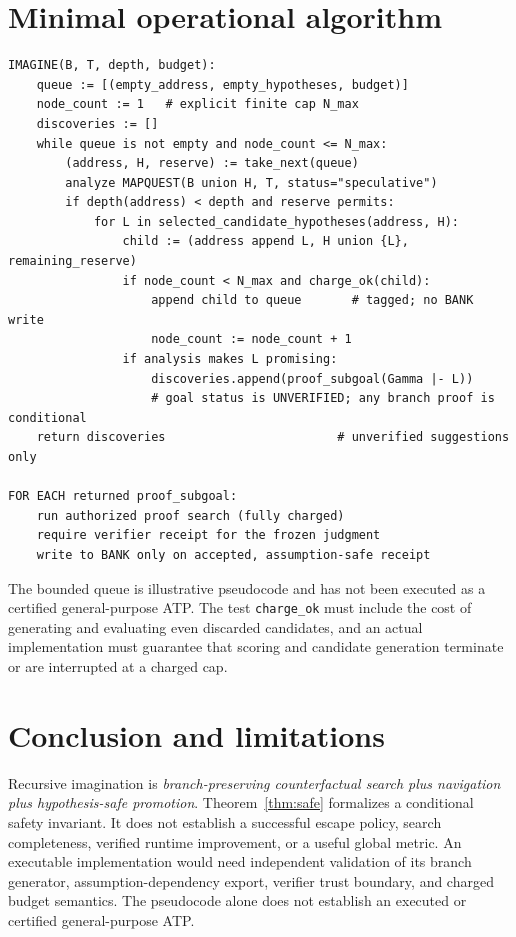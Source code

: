\section{Minimal operational algorithm}
\begin{verbatim}
IMAGINE(B, T, depth, budget):
    queue := [(empty_address, empty_hypotheses, budget)]
    node_count := 1   # explicit finite cap N_max
    discoveries := []
    while queue is not empty and node_count <= N_max:
        (address, H, reserve) := take_next(queue)
        analyze MAPQUEST(B union H, T, status="speculative")
        if depth(address) < depth and reserve permits:
            for L in selected_candidate_hypotheses(address, H):
                child := (address append L, H union {L}, remaining_reserve)
                if node_count < N_max and charge_ok(child):
                    append child to queue       # tagged; no BANK write
                    node_count := node_count + 1
                if analysis makes L promising:
                    discoveries.append(proof_subgoal(Gamma |- L))
                    # goal status is UNVERIFIED; any branch proof is conditional
    return discoveries                        # unverified suggestions only

FOR EACH returned proof_subgoal:
    run authorized proof search (fully charged)
    require verifier receipt for the frozen judgment
    write to BANK only on accepted, assumption-safe receipt
\end{verbatim}
The bounded queue is illustrative pseudocode and has not been executed as a certified general-purpose ATP. The test \texttt{charge\_ok} must include the cost of generating and evaluating even discarded candidates, and an actual implementation must guarantee that scoring and candidate generation terminate or are interrupted at a charged cap.

\section{Conclusion and limitations}
Recursive imagination is \emph{branch-preserving counterfactual search plus navigation plus hypothesis-safe promotion}. Theorem~\ref{thm:safe} formalizes a conditional safety invariant. It does not establish a successful escape policy, search completeness, verified runtime improvement, or a useful global metric. An executable implementation would need independent validation of its branch generator, assumption-dependency export, verifier trust boundary, and charged budget semantics. The pseudocode alone does not establish an executed or certified general-purpose ATP.


